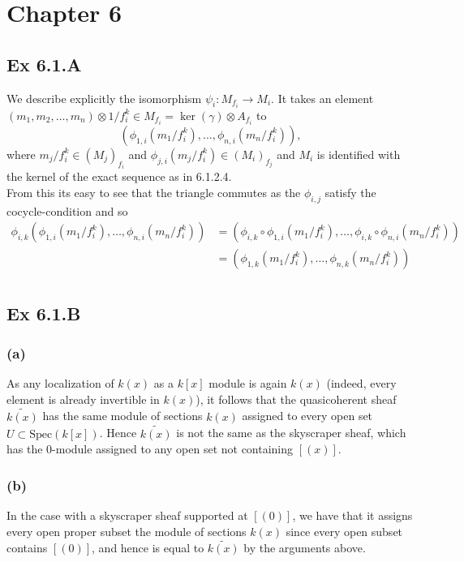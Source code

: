 \documentclass{article}
\theoremstyle{definition}
\newcommand{\Spec}{\text{Spec}}
\begin{document}
\section*{Chapter 6}
\subsection*{Ex 6.1.A}

We describe explicitly the isomorphism $\psi_i : M_{f_i} \to M_{i}$. It takes
an element $(m_{1}, m_{2}, \ldots, m_n) \otimes 1/f_i^{k} \in M_{f_i} =
	\ker(\gamma) \otimes A_{f_i}$ to
\[
	\left(\phi_{1,i}\left(m_1/f_i^{k}\right), \ldots, \phi_{n,i}\left(m_n/f_i^{k}\right)\right),
\]
where $m_j/f_i^{k} \in \left(M_j\right)_{f_i}$ and
$\phi_{j,i}\left(m_j/f_i^{k}\right) \in \left(M_i\right)_{f_j}$ and $M_i$ is
identified with the kernel of the exact sequence as in 6.1.2.4. \\

From this its easy to see that the triangle commutes as the $\phi_{i,j}$
satisfy the cocycle-condition and so
\begin{align*}
	\phi_{i, k} \left(\phi_{1,i}\left(m_1/f_i^{k}\right), \ldots,
	\phi_{n,i}\left(m_n/f_i^{k}\right)\right)
	 & =
	\left(\phi_{i, k} \circ \phi_{1,i}\left(m_1/f_i^{k}\right), \ldots,
	\phi_{i, k} \circ \phi_{n,i}\left(m_n/f_i^{k}\right)\right) \\
	 & =
	\left(\phi_{1,k}\left(m_1/f_i^{k}\right), \ldots,
	\phi_{n,k}\left(m_n/f_i^{k}\right)\right)                   \\
\end{align*}

\subsection*{Ex 6.1.B}
\subsubsection*{(a)}

As any localization of $k(x)$ as a $k[x]$ module is again $k(x)$ (indeed, every
element is already invertible in $k(x)$), it follows that the quasicoherent
sheaf $\widetilde{k(x)}$ has the same module of sections $k(x)$ assigned to
every open set $U \subset \Spec(k[x])$. Hence $\widetilde{k(x)}$ is not the
same as the skyscraper sheaf, which has the $0$-module assigned to any open set
not containing $[(x)]$.

\subsubsection*{(b)}
In the case with a skyscraper sheaf supported at $[(0)]$, we have that it
assigns every open proper subset the module of sections $k(x)$ since every open
subset contains $[(0)]$, and hence is equal to $\widetilde{k(x)}$ by the
arguments above.
\end{document}
